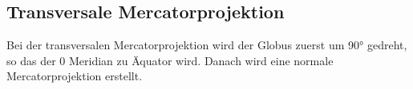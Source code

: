 \subsection{Transversale Mercatorprojektion}
\label{sec:transmercator}
Bei der transversalen  Mercatorprojektion wird der Globus zuerst um 90° gedreht, so das der 0 Meridian zu Äquator wird. Danach wird eine normale Mercatorprojektion erstellt.